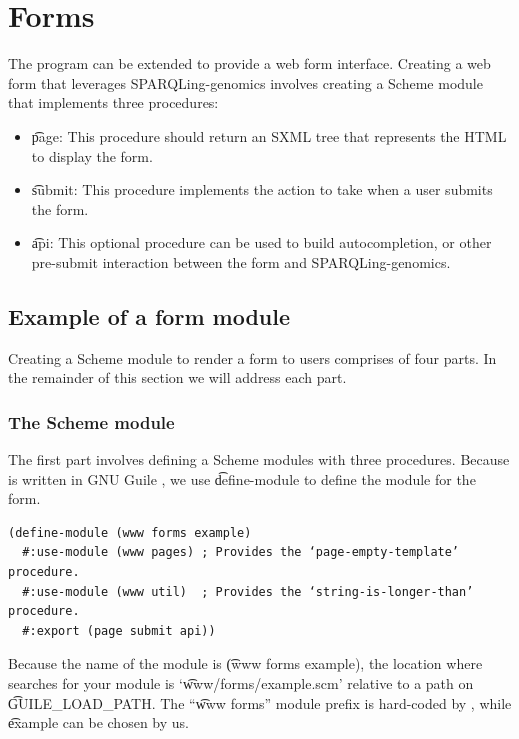 \section{Forms}
\label{sec:forms}

  The  program can be extended to provide a web form interface.
  Creating a web form that leverages SPARQLing-genomics involves creating a
  Scheme module that implements three procedures:
  \begin{itemize}
  \item \t{page}: This procedure should return an SXML tree that represents
    the HTML to display the form.
  \item \t{submit}: This procedure implements the action to take when a user
    submits the form.
  \item \t{api}: This optional procedure can be used to build autocompletion,
    or other pre-submit interaction between the form and SPARQLing-genomics.
  \end{itemize}

\subsection{Example of a form module}

  Creating a Scheme module to render a form to users comprises of four
  parts.  In the remainder of this section we will address each part.

\subsubsection{The Scheme module}
\label{sec:scheme-module}

  The first part involves defining a Scheme modules with three procedures.
  Because  is written in GNU Guile \citep{guile},
  we use \t{define-module} to define the module for the form.

\begin{siderules}
\begin{verbatim}
(define-module (www forms example)
  #:use-module (www pages) ; Provides the ‘page-empty-template’ procedure.
  #:use-module (www util)  ; Provides the ‘string-is-longer-than’ procedure.
  #:export (page submit api))
\end{verbatim}
\end{siderules}

  Because the name of the module is \t{(www forms example)}, the location
  where  searches for your module is `\t{www/forms/example.scm}'
  relative to a path on \t{GUILE\_LOAD\_PATH}.  The ``\t{www forms}'' module
  prefix is hard-coded by , while \t{example} can be chosen by
  us.

